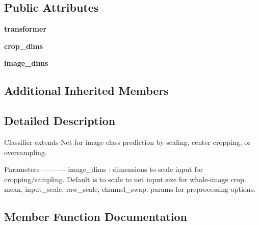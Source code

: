 \subsection*{Public Attributes}
\begin{DoxyCompactItemize}
\item 
\mbox{\label{classcaffe_1_1classifier_1_1_classifier_a44a169043638bbf48513fd17dce4f4b6}} 
{\bfseries transformer}
\item 
\mbox{\label{classcaffe_1_1classifier_1_1_classifier_a298c47f5b8863db1b3fc06ee3ed0b7ac}} 
{\bfseries crop\+\_\+dims}
\item 
\mbox{\label{classcaffe_1_1classifier_1_1_classifier_a5e4d8e8e29e3ad083875dfca03c48ba7}} 
{\bfseries image\+\_\+dims}
\end{DoxyCompactItemize}
\subsection*{Additional Inherited Members}


\subsection{Detailed Description}
\begin{DoxyVerb}Classifier extends Net for image class prediction
by scaling, center cropping, or oversampling.

Parameters
----------
image_dims : dimensions to scale input for cropping/sampling.
    Default is to scale to net input size for whole-image crop.
mean, input_scale, raw_scale, channel_swap: params for
    preprocessing options.
\end{DoxyVerb}
 

\subsection{Member Function Documentation}
\mbox{\label{classcaffe_1_1classifier_1_1_classifier_a8d1d898b351cc84cd9f12ce10401312d}} 
